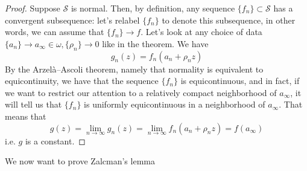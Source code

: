 \documentclass{article}
\newcommand{\mc}[1]{\mathcal{#1}}
\begin{document}
\begin{proof}
Suppose \(\mc{S}\) is normal. Then, by definition, any sequence \(\{f_n\} \subset \mc{S}\) has a convergent subsequence: let's relabel \(\{f_n\}\) to denote this subsequence, in other words, we can assume that \(\{f_n\} \to f\). Let's look at any choice of data \(\{a_n\} \to a_\infty \in \omega, \{\rho_n\} \to 0\) like in the theorem. We have
\begin{equation}g_n(z) = f_n(a_n + \rho_nz)\end{equation}
By the Arzelà–Ascoli theorem, namely that normality is equivalent to equicontinuity, we have that the sequence \(\{f_n\}\) is equicontinuous, and in fact, if we want to restrict our attention to a relatively compact neighborhood of \(a_\infty\), it will tell us that \(\{f_n\}\) is uniformly equicontinuous in a neighborhood of \(a_\infty\). That means that
\begin{equation}g(z) = \lim_{n \to \infty}g_n(z) = \lim_{n \to \infty}f_n(a_n + \rho_nz) = f(a_\infty)\end{equation}
i.e. \(g\) is a constant.
\end{proof}
We now want to prove Zalcman's lemma
\end{document}
